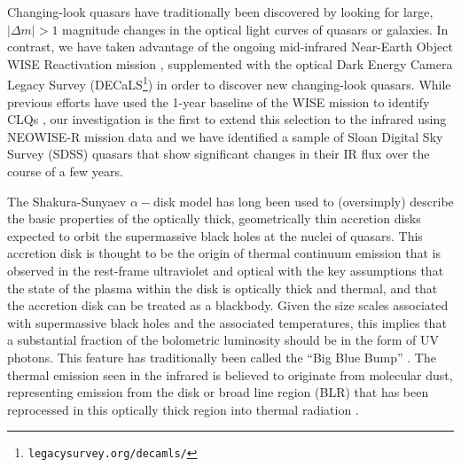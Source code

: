 \documentclass{nature}
\begin{document}
Changing-look quasars have traditionally been discovered by looking
for large, $| \Delta m | >1$ magnitude changes in the optical light
curves of quasars or galaxies. In contrast, we have taken advantage of
the ongoing mid-infrared Near-Earth Object WISE Reactivation mission
\cite[NEOWISE-R; ][]{Mainzer2014, Meisner2017a, Meisner2017b},
supplemented with the optical Dark Energy Camera Legacy Survey
(DECaLS\footnote{{\tt legacysurvey.org/decamls/}}) in order to
discover new changing-look quasars. While previous efforts have used
the 1-year baseline of the WISE mission to identify CLQs
\cite[e.g.,][]{Assef2017}, our investigation is the first to extend
this selection to the infrared using NEOWISE-R mission data and we
have identified a sample of Sloan Digital Sky Survey (SDSS) quasars
that show significant changes in their IR flux over the course of a
few years.

The Shakura-Sunyaev $\alpha-$disk model \cite{SS73} has long been used
to (oversimply) describe the basic properties of the optically thick,
geometrically thin accretion disks expected to orbit the supermassive
black holes at the nuclei of quasars.  This accretion disk is thought
to be the origin of thermal continuum emission that is observed in the
rest-frame ultraviolet and optical with the key assumptions that the
state of the plasma within the disk is optically thick and thermal,
and that the accretion disk can be treated as a blackbody. Given the
size scales associated with supermassive black holes and the
associated temperatures, this implies that a substantial fraction of
the bolometric luminosity should be in the form of UV photons. This
feature has traditionally been called the ``Big Blue Bump''
\cite{Shields1978, Malkan_Sargent1982}. The thermal emission seen in
the infrared is believed to originate from molecular dust,
representing emission from the disk or broad line region (BLR) that
has been reprocessed in this optically thick region into thermal
radiation \citep[see ][for reviews]{Antonucci1993, Perlman2008,
Lasota2016}.
\end{document}
